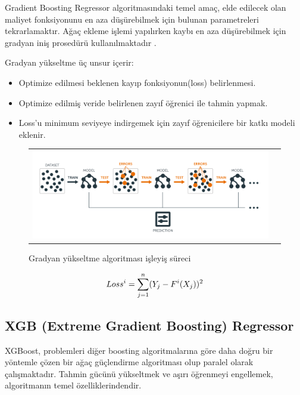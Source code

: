 \documentclass[conference]{IEEEtran}
\begin{document}
\quad Gradient Boosting Regressor algoritmasındaki temel amaç, elde edilecek olan maliyet fonksiyonunu en aza düşürebilmek için bulunan parametreleri tekrarlamaktır. Ağaç ekleme işlemi yapılırken kaybı en aza düşürebilmek için gradyan iniş prosedürü kullanılmaktadır \cite{6}.

Gradyan yükseltme üç unsur içerir:

\begin{itemize}
\item Optimize edilmesi beklenen kayıp fonksiyonun(loss) belirlenmesi. 
\item Optimize edilmiş veride belirlenen zayıf öğrenici ile tahmin yapmak. 
\item Loss’u minimum seviyeye indirgemek için zayıf öğrenicilere bir katkı modeli eklenir\cite{7}.
\end{itemize}

\begin{figure}[!h]
	\centering
	\begin{center}
		\begin{tabular}{cc}
			\includegraphics[scale=0.5]{pictures/pic_03.png}&
		\end{tabular}
	\end{center}
	\caption{Gradyan yükseltme algoritması işleyiş süreci\cite{16}}
	\label{fig:03}
\end{figure}

\begin{equation}
\label{eq:03}
\Large Loss^i=\sum_{j=1}^{n}(Y_{j}-F^i(X_{j}))^2
\end{equation}

\pagebreak
\subsection{\textbf{XGB (Extreme Gradient Boosting) Regressor}}

\quad XGBoost, problemleri diğer boosting algoritmalarına göre daha doğru bir yöntemle çözen bir ağaç güçlendirme algoritması olup paralel olarak çalışmaktadır\cite{9}. Tahmin gücünü yükseltmek ve aşırı öğrenmeyi engellemek, algoritmanın temel özelliklerindendir\cite{10}.
\end{document}
